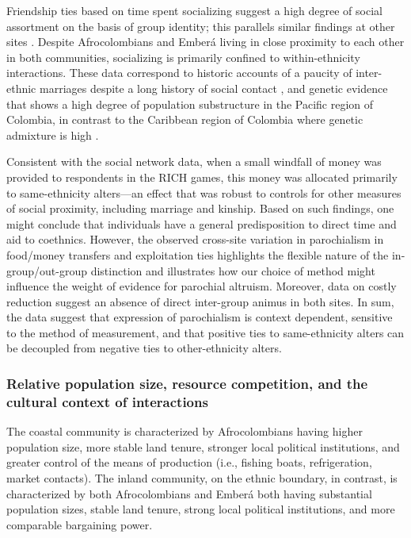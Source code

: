 \documentclass[bibauthoryear]{aa}
\begin{document}
Friendship ties based on time spent socializing  suggest a high degree of social assortment on the basis of group identity; this parallels similar findings at other sites \cite[e.g.,][]{power2017social, baerveldt2007ethnic}. Despite Afrocolombians and Ember\'a living in close proximity to each other in both communities, socializing is primarily confined to within-ethnicity interactions. These data correspond to historic accounts of a paucity of inter-ethnic marriages despite a long history of social contact \citep{Cay73}, and genetic evidence that shows a high degree of population substructure in the Pacific region of Colombia, in contrast to the Caribbean region of Colombia where genetic admixture is high \citep{ossa2016outlining}.

Consistent with the social network data, when a small windfall of money was provided to respondents in the RICH games, this money was allocated primarily to same-ethnicity alters---an effect that was robust to controls for other measures of social proximity, including marriage and kinship. %
Based on such findings, one might conclude that individuals have a general predisposition to direct time and aid to coethnics.  However, the observed cross-site variation in parochialism in food/money transfers and exploitation ties highlights the flexible nature of the in-group/out-group distinction and illustrates how our choice of method might influence the weight of evidence for parochial altruism. Moreover, data on costly reduction suggest an absence of direct inter-group animus in both sites. In sum, the data suggest that expression of parochialism is context dependent, sensitive to the method of measurement, and that positive ties to same-ethnicity alters can be decoupled from negative ties to other-ethnicity alters.

\subsubsection{Relative population size, resource competition, and the cultural context of interactions}
\label{contextcc}
The coastal community is characterized by Afrocolombians having higher population size, more stable land tenure,  stronger local political institutions, and greater control of the means of production (i.e., fishing boats, refrigeration, market contacts). The inland community, on the ethnic boundary, in contrast, is characterized by both Afrocolombians and Ember\'a both having substantial population sizes, stable land tenure, strong local political institutions, and more comparable bargaining power. 
\end{document}
